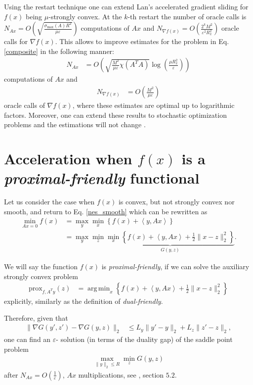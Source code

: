 \documentclass[final]{siamart1116}
\DeclareMathOperator*{\argmin}{arg\,min}
\numberwithin{theorem}{section}
\begin{document}
	Using the restart technique \cite{iou14,jud11} one can extend Lan's accelerated gradient sliding for $f(x)$ being $\mu$-strongly convex. At the $k$-th restart the number of oracle calls is \mbox{$N_{Ax}=O\left(  \sqrt{\frac{\sigma_{\max}(A)R^2}{\mu\varepsilon}}\right)$} computations of $Ax$ and $N_{\nabla f(x)} = O\left(  \frac{2^kM^2 }{\varepsilon^2 R_x^2}\right) $ oracle calls for $\nabla f(x)$. This allows to improve estimates for the problem in Eq. \eqref{composite} in the following manner:
	\begin{align}\label{prox1}
	N_{Ax} & = O\left( \sqrt{\frac{M^2}{\mu \varepsilon} \chi(A^TA)} \log \left( \frac{\mu R^2_x}{\varepsilon}\right)  \right) 
	\end{align}
	computations of $Ax$ and
	\begin{align}\label{prox2}
	N_{\nabla f(x)} & = O \left( \frac{ M^2 }{\mu\varepsilon}\right) 
	\end{align}
	oracle calls of $\nabla f(x)$, where these estimates are optimal up to logarithmic factors. Moreover, one can extend these results to stochastic optimization problems and the estimations will not change \cite{lan17}.
	
	\section{Acceleration when $f(x)$ is a \textit{proximal-friendly} functional}\label{sec:prox}
	
	Let us consider the case when $f(x)$ is convex, but not strongly convex nor smooth, and return to Eq. \eqref{nes_smooth} which can be rewritten as
	\begin{align*}
	\min_{Ax=0} f(x) & = \max_y \min_x \left\lbrace  f(x) + \left\langle y,Ax \right\rangle \right\rbrace  \\
	& = \max_y \min_z \underbrace{\min_x \left\lbrace f(x) + \left\langle y,Ax \right\rangle + \frac{1}{2} \|x-z\|_2^2 \right\rbrace }_{G(y,z)}.
	\end{align*}
	
	We will say the function $f(x)$ is \textit{proximal-friendly}, if  we can solve the auxiliary strongly convex problem
	\begin{align*}
	\text{prox}_{f,A^Ty} (z) & = \argmin_x \left\lbrace f(x) + \left\langle y,Ax \right\rangle + \frac{1}{2}\|x-z\|_2^2\right\rbrace 
	\end{align*}
	explicitly, similarly as the definition of \textit{dual-friendly}.
	
	Therefore, given that
	\begin{align*}
	\|\nabla G(y',z') - \nabla G(y,z) \|_2 & \leq L_y\|y' - y\|_2 +L_z\|z' - z\|_2 ,
	\end{align*}
	one can find an $\varepsilon$- solution (in terms of the duality gap) of the saddle point problem
	\begin{align*}
	\max_{\|y\|_2\leq R} \min_z G(y,z)
	\end{align*}
	after $N_{Ax} = O\left( \frac{1}{\varepsilon}\right) $, $Ax$ multiplications, see \cite{bub15}, section $5.2$.
	
\end{document}
